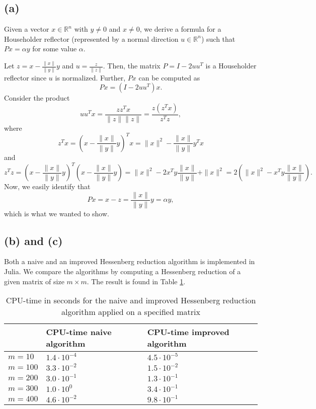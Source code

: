 
\subsection*{(a)}
Given a vector $x\in \mathbb R^n$ with $y\neq 0$ and $x\neq 0$, we derive a formula for a Householder reflector (represented by a normal direction $u\in\mathbb R^n$) such that $Px = \alpha y$ for some value $\alpha$. 

Let $z = x-\frac{\|x\|}{\|y\|}y$ and $u = \frac{z}{\|z\|}$. Then, the matrix $P = I-2uu^T$ is a Householder reflector since $u$ is normalized. Further, $Px$ can be computed as 
\begin{equation}
Px = (I-2uu^T)x.
\end{equation}
Consider the product
\begin{equation}
uu^Tx = \frac{zz^Tx}{\|z\|\|z\|} = \frac{z(z^Tx)}{z^Tz},
\end{equation}
where 
\begin{equation}
z^Tx = \left(x-\frac{\|x\|}{\|y\|}y\right)^Tx = \|x\|^2-\frac{\|x\|}{\|y\|}y^Tx
\end{equation}
and
\begin{equation}
z^Tz = \left(x-\frac{\|x\|}{\|y\|}y\right)^T\left(x-\frac{\|x\|}{\|y\|}y\right)=\|x\|^2-2x^Ty\frac{\|x\|}{\|y\|}+\|x\|^2 = 2\left(\|x\|^2-x^Ty\frac{\|x\|}{\|y\|}\right).
\end{equation}
Now, we easily identify that 
\begin{equation}
Px = x-z =\frac{\|x\|}{\|y\|}y = \alpha y,
\end{equation}
which is what we wanted to show. 
\subsection*{(b) and (c)}
Both a naive and an improved Hessenberg reduction algorithm is implemented in Julia. We compare the algorithms by computing a Hessenberg reduction of a given matrix of size $m\times m$. The result is found in Table \ref{task3}.
\begin{table}[h!]
	\centering
	\caption{CPU-time in seconds for the naive and improved Hessenberg reduction algorithm applied on a specified matrix}
	\label{task3}
	\begin{tabular}{l | l | l }
		& CPU-time naive algorithm & CPU-time improved algorithm \\ \hline\hline
		$m = 10$ & $1.4\cdot 10^{-4}$ & $4.5\cdot 10^{-5}$\\ \hline
		$m = 100$ & $3.3\cdot 10^{-2}$ & $ 1.5\cdot 10^{-2}$\\  \hline
		$m = 200$ & $3.0\cdot 10^{-1}$ & $ 1.3\cdot 10^{-1}$\\  \hline
		$m = 300$ & $1.0\cdot 10^{0}$ & $ 3.4\cdot 10^{-1}$\\  \hline
		$m = 400$ & $4.6\cdot 10^{-2}$ & $ 9.8\cdot 10^{-1}$\\  \hline
	\end{tabular}
\end{table}

